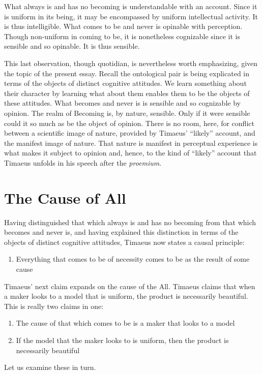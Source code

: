 What always is and has no becoming is understandable with an account. Since it is uniform in its being, it may be encompassed by uniform intellectual activity. It is thus intelligible. What comes to be and never is opinable with perception. Though non-uniform in coming to be, it is nonetheless cognizable since it is sensible and so opinable. It is thus sensible.

This last observation, though quotidian, is nevertheless worth emphasizing, given the topic of the present essay. Recall the ontological pair is being explicated in terms of the objects of distinct cognitive attitudes. We learn something about their character by learning what about them enables them to be the objects of these attitudes. What becomes and never is is sensible and so cognizable by opinion. The realm of Becoming is, by nature, sensible. Only if it were sensible could it so much as be the object of opinion. There is no room, here, for conflict between a scientific image of nature, provided by Timaeus' ``likely'' account, and the manifest image of nature. That nature is manifest in perceptual experience is what makes it subject to opinion and, hence, to the kind of ``likely'' account that Timaeus unfolds in his speech after the \emph{proemium}.


\section{The Cause of All} %
\label{sec:the_cause_of_all}

Having distinguished that which always is and has no becoming from that which becomes and never is, and having explained this distinction in terms of the objects of distinct cognitive attitudes, Timaeus now states a causal principle:
\begin{enumerate}[(1)]
	\item Everything that comes to be of necessity comes to be as the result of some cause
\end{enumerate}
Timaeus' next claim expands on the cause of the All. Timaeus claims that when a maker looks to a model that is uniform, the product is necessarily beautiful. This is really two claims in one:
\begin{enumerate}[(1)]\addtocounter{enumi}{1}
	\item The cause of that which comes to be is a maker that looks to a model
	\item If the model that the maker looks to is uniform, then the product is necessarily beautiful
\end{enumerate}
Let us examine these in turn.

